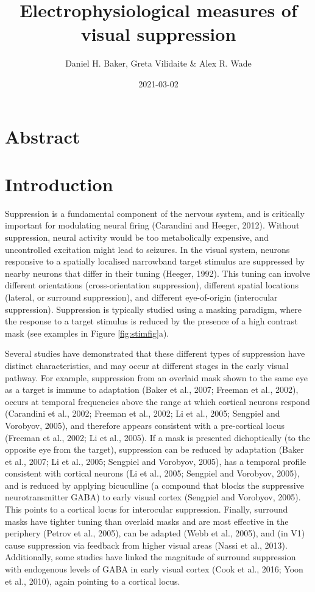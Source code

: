 \documentclass[]{article}
\title{Electrophysiological measures of visual suppression}
\author{Daniel H. Baker, Greta Vilidaite \& Alex R. Wade}
\date{2021-03-02}
\begin{document}
\maketitle

\hypertarget{abstract}{%
\section{Abstract}\label{abstract}}

\hypertarget{introduction}{%
\section{Introduction}\label{introduction}}

Suppression is a fundamental component of the nervous system, and is critically important for modulating neural firing (Carandini and Heeger, 2012). Without suppression, neural activity would be too metabolically expensive, and uncontrolled excitation might lead to seizures. In the visual system, neurons responsive to a spatially localised narrowband target stimulus are suppressed by nearby neurons that differ in their tuning (Heeger, 1992). This tuning can involve different orientations (cross-orientation suppression), different spatial locations (lateral, or surround suppression), and different eye-of-origin (interocular suppression). Suppression is typically studied using a masking paradigm, where the response to a target stimulus is reduced by the presence of a high contrast mask (see examples in Figure \ref{fig:stimfig}a).

Several studies have demonstrated that these different types of suppression have distinct characteristics, and may occur at different stages in the early visual pathway. For example, suppression from an overlaid mask shown to the same eye as a target is immune to adaptation (Baker et al., 2007; Freeman et al., 2002), occurs at temporal frequencies above the range at which cortical neurons respond (Carandini et al., 2002; Freeman et al., 2002; Li et al., 2005; Sengpiel and Vorobyov, 2005), and therefore appears consistent with a pre-cortical locus (Freeman et al., 2002; Li et al., 2005). If a mask is presented dichoptically (to the opposite eye from the target), suppression can be reduced by adaptation (Baker et al., 2007; Li et al., 2005; Sengpiel and Vorobyov, 2005), has a temporal profile consistent with cortical neurons (Li et al., 2005; Sengpiel and Vorobyov, 2005), and is reduced by applying bicuculline (a compound that blocks the suppressive neurotransmitter GABA) to early visual cortex (Sengpiel and Vorobyov, 2005). This points to a cortical locus for interocular suppression. Finally, surround masks have tighter tuning than overlaid masks and are most effective in the periphery (Petrov et al., 2005), can be adapted (Webb et al., 2005), and (in V1) cause suppression via feedback from higher visual areas (Nassi et al., 2013). Additionally, some studies have linked the magnitude of surround suppression with endogenous levels of GABA in early visual cortex (Cook et al., 2016; Yoon et al., 2010), again pointing to a cortical locus.
\end{document}
